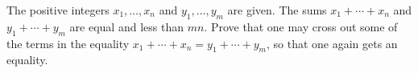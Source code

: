 The positive integers $x_1, \ldots, x_n$ and $y_1, \ldots, y_m$ are given. The sums $x_1 + \cdots + x_n$ and $y_1 + \cdots + y_m$ are equal and less than $mn$. Prove that one may cross out some of the terms in the equality $x_1 + \cdots + x_n = y_1 + \cdots + y_m$, so that one again gets an equality.
